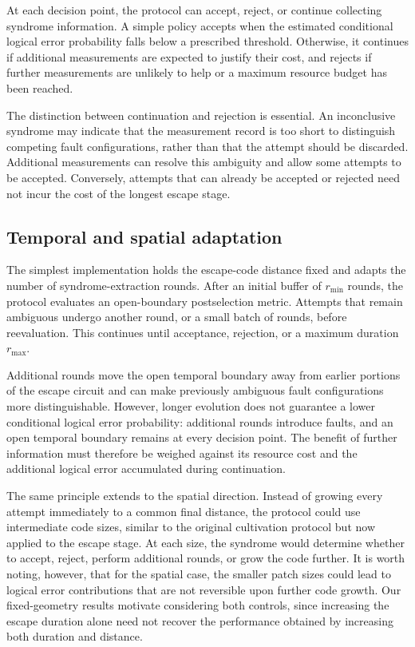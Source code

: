 \documentclass[
    reprint,
    amsmath,amssymb,
    nofootinbib,
    superscriptaddress,
    aps,
    noeprint,
    longbibliography,
    prl
]{revtex4-2}
\theoremstyle{plain}
\begin{document}
At each decision point, the protocol can accept, reject, or continue collecting syndrome information. A simple policy accepts when the estimated conditional logical error probability falls below a prescribed threshold. Otherwise, it continues if additional measurements are expected to justify their cost, and rejects if further measurements are unlikely to help or a maximum resource budget has been reached.

The distinction between continuation and rejection is essential. An inconclusive syndrome may indicate that the measurement record is too short to distinguish competing fault configurations, rather than that the attempt should be discarded. Additional measurements can resolve this ambiguity and allow some attempts to be accepted. Conversely, attempts that can already be accepted or rejected need not incur the cost of the longest escape stage.

\subsection{Temporal and spatial adaptation}

The simplest implementation holds the escape-code distance fixed and adapts the number of syndrome-extraction rounds. After an initial buffer of $r_{\min}$ rounds, the protocol evaluates an open-boundary postselection metric. Attempts that remain ambiguous undergo another round, or a small batch of rounds, before reevaluation. This continues until acceptance, rejection, or a maximum duration $r_{\max}$.

Additional rounds move the open temporal boundary away from earlier portions of the escape circuit and can make previously ambiguous fault configurations more distinguishable. However, longer evolution does not guarantee a lower conditional logical error probability: additional rounds introduce faults, and an open temporal boundary remains at every decision point. The benefit of further information must therefore be weighed against its resource cost and the additional logical error accumulated during continuation.

The same principle extends to the spatial direction. Instead of growing every attempt immediately to a common final distance, the protocol could use intermediate code sizes, similar to the original cultivation protocol but now applied to the escape stage. At each size, the syndrome would determine whether to accept, reject, perform additional rounds, or grow the code further. It is worth noting, however, that for the spatial case, the smaller patch sizes could lead to logical error contributions that are not reversible upon further code growth. Our fixed-geometry results motivate considering both controls, since increasing the escape duration alone need not recover the performance obtained by increasing both duration and distance.
\end{document}
